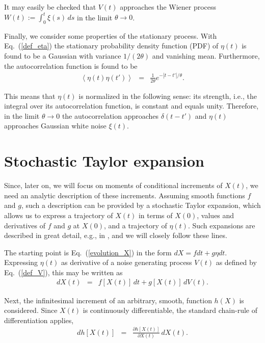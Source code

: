 \documentclass[aps,twocolumn,superscriptaddress,showpacs,showkeys]{revtex4}
\newcommand{\p}{\partial}
\begin{document}
\noindent It may easily be checked that $V(t)$ approaches the Wiener process $W(t):=\int_0^t \xi(s)\,ds$ in the limit
$\theta\to 0$.

Finally, we consider some properties of the stationary process. With Eq.~(\ref{def_eta}) the
stationary probability density function (PDF) of $\eta(t)$ is found to be a Gaussian with variance $1/(2\theta)$ and
vanishing mean. Furthermore, the autocorrelation function is found to be
%
\begin{eqnarray}
\left<\eta(t)\eta(t')\right> &=& \frac{1}{2\theta}e^{-|t-t'|/\theta}.
\end{eqnarray}

\noindent This means that $\eta(t)$ is normalized in the following sense: its strength, i.e., the integral over its
autocorrelation function, is constant and equals unity.
Therefore, in the limit $\theta\!\to\!0$ the autocorrelation approaches $\delta(t-t')$ and $\eta(t)$ approaches
Gaussian white noise $\xi(t)$.

\section{Stochastic Taylor expansion}
\label{sec_Taylor}

\noindent Since, later on, we will focus on moments of conditional increments of $X(t)$, we need an analytic description
of these increments. Assuming smooth functions $f$ and $g$, such a description can be provided by a stochastic Taylor
expansion, which allows us to express a trajectory of $X(t)$ in terms of $X(0)$, values and derivatives of $f$ and $g$
at $X(0)$, and a trajectory of $\eta(t)$. Such expansions are described in great detail, e.g., in \cite{platen99}, and
we will closely follow these lines.

The starting point is Eq.~(\ref{evolution_X}) in the form $dX=fdt+g\eta dt$. Expressing $\eta(t)$ as derivative of
a noise generating process $V(t)$ as defined by Eq.~(\ref{def_V}), this may be written as
%
\begin{eqnarray}\label{def_dX}
dX(t) &=& f[X(t)]\,dt+g[X(t)]\,dV(t).
\end{eqnarray}

\noindent Next, the infinitesimal increment of an arbitrary, smooth, function $h(X)$ is considered. Since $X(t)$ is
continuously differentiable, the standard chain-rule of differentiation applies,
%
\begin{eqnarray}
dh[X(t)] &=& \frac{\p h[X(t)]}{\p X(t)} \,dX(t).
\end{eqnarray}
\end{document}
